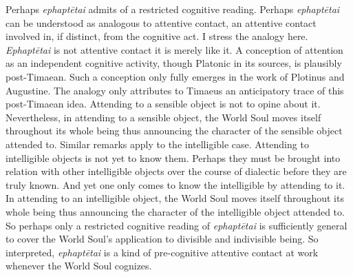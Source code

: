 Perhaps \emph{ephaptētai} admits of a restricted cognitive reading. Perhaps \emph{ephaptētai} can be understood as analogous to attentive contact, an attentive contact involved in, if distinct, from the cognitive act. I stress the analogy here. \emph{Ephaptētai} is not attentive contact it is merely like it. A conception of attention as an independent cognitive activity, though Platonic in its sources, is plausibly post-Timaean. Such a conception only fully emerges in the work of Plotinus and Augustine. The analogy only attributes to Timaeus an anticipatory trace of this post-Timaean idea. Attending to a sensible object is not to opine about it. Nevertheless, in attending to a sensible object, the World Soul moves itself throughout its whole being thus announcing the character of the sensible object attended to. Similar remarks apply to the intelligible case. Attending to intelligible objects is not yet to know them. Perhaps they must be brought into relation with other intelligible objects over the course of dialectic before they are truly known. And yet one only comes to know the intelligible by attending to it. In attending to an intelligible object, the World Soul moves itself throughout its whole being thus announcing the character of the intelligible object attended to. So perhaps only a restricted cognitive reading of \emph{ephaptētai} is sufficiently general to cover the World Soul's application to divisible and indivisible being. So interpreted, \emph{ephaptētai} is a kind of pre-cognitive attentive contact at work whenever the World Soul cognizes.

